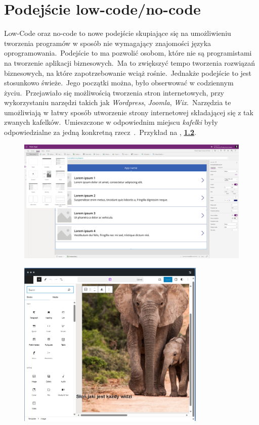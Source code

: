 \chapter{Podejście low-code/no-code}
Low-Code oraz no-code to nowe podejście skupiające się na umożliwieniu tworzenia programów w sposób nie wymagający znajomości języka oprogramowania.\ Podejście to ma pozwolić osobom, które nie są programistami na tworzenie aplikacji biznesowych.\ Ma to zwiększyć tempo tworzenia rozwiązań biznesowych, na które zapotrzebowanie wciąż rośnie.\ Jednakże podejście to jest stosunkowo świeże.\ Jego początki można, było obserwować w codziennym życiu.\ Przejawiało się możliwością tworzenia stron internetowych, przy wykorzystaniu narzędzi takich jak \textit{Wordpress}, \textit{Joomla}, \textit{Wix}.\ Narzędzia te umożliwiają w łatwy sposób utworzenie strony internetowej składającej się z tak zwanych kafelków.\ Umieszczone w odpowiednim miejscu \textit{kafelki} były odpowiedzialne za jedną konkretną rzecz~\cite{Wordpress2023, Joomla2023, Wix2023}.\ Przykład na , \textbf{\ref{fig:wp-plat}}.
\begin{figure}[H]
    \centering
    \includegraphics[width=\textwidth]{images/ms_powerapps}
    \label{fig:pa-plat}
\end{figure}

\vfill
\pagebreak

\begin{figure}[H]
    \centering
    \includegraphics[width=0.8\textwidth]{images/slon_wordpress}
    \label{fig:wp-plat}
\end{figure}

